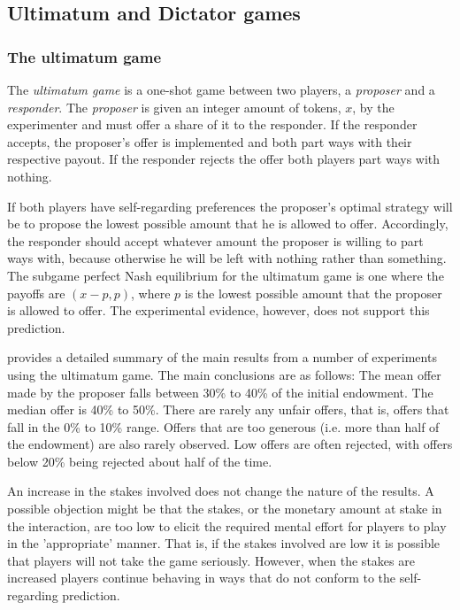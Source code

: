 \documentclass[12pt]{article}
\begin{document}
\subsection{Ultimatum and Dictator games}
\subsubsection{The ultimatum game}
The \textit{ultimatum game} is a one-shot game between two players, a \textit{proposer} and a \textit{responder}. The \textit{proposer} is given an integer amount of tokens, $x$, by the experimenter and must offer a share of it to the responder. If the responder accepts, the proposer's offer is implemented and both part ways with their respective payout. If the responder rejects the offer both players part ways with nothing.

If both players have self-regarding preferences the proposer's optimal strategy will be to propose the lowest possible amount that he is allowed to offer. Accordingly, the responder should accept whatever amount the proposer is willing to part ways with, because otherwise he will be left with nothing rather than something. The subgame perfect Nash equilibrium for the ultimatum game is one where the payoffs are $\left(x-p,p \right)$, where $p$ is the lowest possible amount that the proposer is allowed to offer. The experimental evidence, however, does not support this prediction. 

\cite{camerer2011behavioral} provides a detailed summary of the main results from a number of experiments using the ultimatum game. The main conclusions are as follows: The mean offer  made by the proposer falls between 30\% to 40\% of the initial endowment. The median offer is 40\% to 50\%. There are rarely any unfair offers, that is, offers that fall in the 0\% to 10\% range. Offers that are too generous (i.e. more than half of the endowment) are also rarely observed. Low offers are often rejected, with offers below 20\% being rejected about half of the time. 

An increase in the stakes involved does not change the nature of the results. A possible objection might be that the stakes, or the monetary amount at stake in the interaction, are too low to elicit the required mental effort for players to play in the 'appropriate' manner. That is, if the stakes involved are low it is possible that players will not take the game seriously. However, when the stakes are increased players continue behaving in ways that do not conform to the self-regarding prediction.
\end{document}
